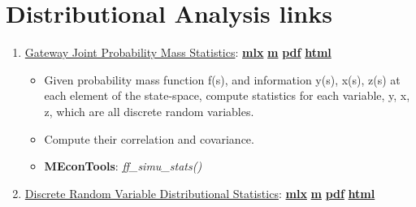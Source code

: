\documentclass[
]{book}
\providecommand{\tightlist}{%
  \setlength{\itemsep}{0pt}\setlength{\parskip}{0pt}}
\begin{document}
\hypertarget{distributional-analysis-links}{%
\section{Distributional Analysis links}\label{distributional-analysis-links}}

\begin{enumerate}
\def\labelenumi{\arabic{enumi}.}
\tightlist
\item
  \href{https://fanwangecon.github.io/MEconTools/MEconTools/doc/stats/htmlpdfm/fx_simu_stats.html}{Gateway Joint Probability Mass Statistics}: \href{https://github.com/FanWangEcon/MEconTools/blob/master/MEconTools/doc/stats/fx_simu_stats.mlx}{\textbf{mlx}} \textbar{} \href{https://github.com/FanWangEcon/MEconTools/blob/master/MEconTools/doc/stats/htmlpdfm/fx_simu_stats.m}{\textbf{m}} \textbar{} \href{https://github.com/FanWangEcon/MEconTools/blob/master/MEconTools/doc/stats/htmlpdfm/fx_simu_stats.pdf}{\textbf{pdf}} \textbar{} \href{https://fanwangecon.github.io/MEconTools/MEconTools/doc/stats/htmlpdfm/fx_simu_stats.html}{\textbf{html}}

  \begin{itemize}
  \tightlist
  \item
    Given probability mass function f(s), and information y(s), x(s), z(s) at each element of the state-space, compute statistics for each variable, y, x, z, which are all discrete random variables.
  \item
    Compute their correlation and covariance.
  \item
    \textbf{MEconTools}: \emph{ff\_simu\_stats()}
  \end{itemize}
\item
  \href{https://fanwangecon.github.io/MEconTools/MEconTools/doc/stats/htmlpdfm/fx_disc_rand_var_stats.html}{Discrete Random Variable Distributional Statistics}: \href{https://github.com/FanWangEcon/MEconTools/blob/master/MEconTools/doc/stats/fx_disc_rand_var_stats.mlx}{\textbf{mlx}} \textbar{} \href{https://github.com/FanWangEcon/MEconTools/blob/master/MEconTools/doc/stats/htmlpdfm/fx_disc_rand_var_stats.m}{\textbf{m}} \textbar{} \href{https://github.com/FanWangEcon/MEconTools/blob/master/MEconTools/doc/stats/htmlpdfm/fx_disc_rand_var_stats.pdf}{\textbf{pdf}} \textbar{} \href{https://fanwangecon.github.io/MEconTools/MEconTools/doc/stats/htmlpdfm/fx_disc_rand_var_stats.html}{\textbf{html}}


\end{enumerate}
\end{document}
